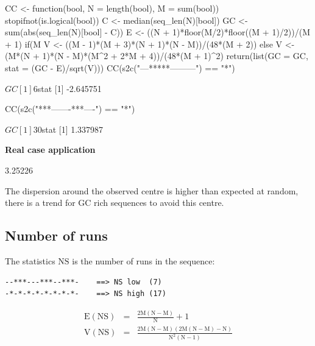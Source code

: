 \documentclass{article}
\begin{document}
\begin{Schunk}
\begin{Sinput}
 CC <- function(bool, N = length(bool), M = sum(bool)){
 	stopifnot(is.logical(bool))
 	C <- median(seq_len(N)[bool])
 	GC <- sum(abs(seq_len(N)[bool] - C))
 	E <- ((N + 1)*floor(M/2)*floor((M + 1)/2))/(M + 1)
 	if(M %
 	  V <- ((M - 1)*(M + 3)*(N + 1)*(N - M))/(48*(M + 2))
 	else
 	  V <- (M*(N + 1)*(N - M)*(M^2 + 2*M + 4))/(48*(M + 1)^2)
 	return(list(GC = GC, stat = (GC - E)/sqrt(V)))
 }
 CC(s2c("---*****---------") == "*")
\end{Sinput}
\begin{Soutput}
$GC
[1] 6

$stat
[1] -2.645751
\end{Soutput}
\begin{Sinput}
 CC(s2c("***-------***----") == "*")
\end{Sinput}
\begin{Soutput}
$GC
[1] 30

$stat
[1] 1.337987
\end{Soutput}
\end{Schunk}

\noindent\textbf{Real case application}

\begin{Schunk}
\begin{Soutput}
[1] 3.25226
\end{Soutput}
\end{Schunk}

The dispersion around the observed centre is higher than expected at random, there is a trend for
GC rich sequences to avoid this centre.



\subsection{Number of runs}

The statistics $$ is the number of runs in the sequence:

\begin{verbatim}
--***---***--***-    ==> NS low  (7)
-*-*-*-*-*-*-*-*-    ==> NS high (17)
\end{verbatim}

\begin{eqnarray*}
\mathrm{E(NS)} & = & \mathrm{\frac{2M(N - M)}{N} + 1} \\
\mathrm{V(NS)} & = & \mathrm{\frac{2M(N - M)(2M(N - M) - N)}{N^2(N - 1)}}
\end{eqnarray*}
\end{document}
